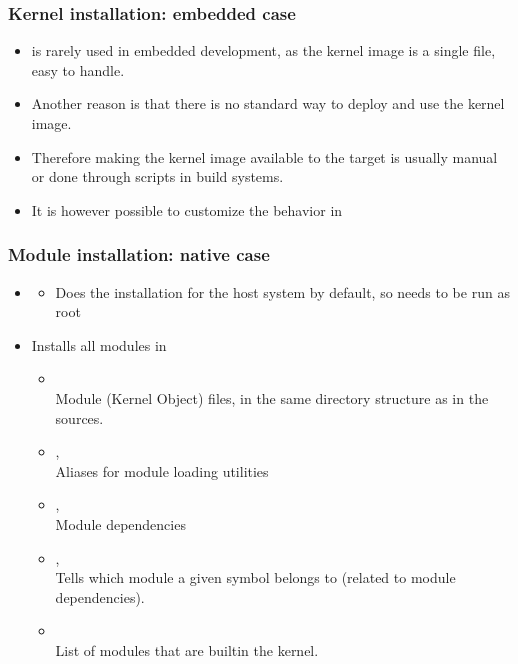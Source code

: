 \begin{frame}
  \frametitle{Kernel installation: embedded case}
  \begin{itemize}
  \item {} is rarely used in embedded development, as the
    kernel image is a single file, easy to handle.
  \item Another reason is that there is no standard way to deploy and
    use the kernel image.
  \item Therefore making the kernel image available to the target is
    usually manual or done through scripts in build systems.
  \item It is however possible to customize the 
    behavior in 
  \end{itemize}
\end{frame}

\begin{frame}
  \frametitle{Module installation: native case}
  \begin{itemize}
  \item {}
    \begin{itemize}
    \item Does the installation for the host system by default, so
      needs to be run as root
    \end{itemize}
  \item Installs all modules in 
    \begin{itemize}
    \item {}\\
      Module  (Kernel Object) files, in the same directory
      structure as in the sources.
    \item {}, \\
      Aliases for module loading utilities
    \item {}, \\
      {
        Module dependencies
      }
    \item {}, \\
      Tells which module a given symbol belongs to (related to
      module dependencies).
    \item {}\\
      List of modules that are builtin the kernel.
    \end{itemize}
  \end{itemize}
\end{frame}

